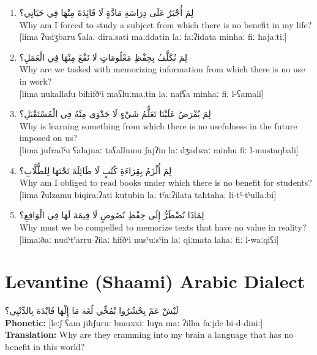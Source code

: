 \documentclass[letterpaper,12pt]{article}
\begin{document}
\begin{enumerate}
\item \textarabic{لِمَ أُجْبَرُ عَلَى دِرَاسَةِ مَادَّةٍ لَا فَائِدَةَ مِنْهَا فِي حَيَاتِي؟}\\
Why am I forced to study a subject from which there is no benefit in my life?\\
{[lima ʔudʒbaru ʕalaː diraːsati maːddatin laː faːʔidata minhaː fiː ħajaːtiː]}

\item \textarabic{لِمَ نُكَلَّفُ بِحِفْظِ مَعْلُومَاتٍ لَا نَفْعَ مِنْهَا فِي الْعَمَلِ؟}\\
Why are we tasked with memorizing information from which there is no use in work?\\
{[lima nukallafu biħifðˤi maʕluːmaːtin laː nafʕa minhaː fiː l-ʕamali]}

\item \textarabic{لِمَ يُفْرَضُ عَلَيْنَا تَعَلُّمُ شَيْءٍ لَا جَدْوَى مِنْهُ فِي الْمُسْتَقْبَلِ؟}\\
Why is learning something from which there is no usefulness in the future imposed on us?\\
{[lima jufradˤu ʕalajnaː taʕallumu ʃajʔin laː dʒadwaː minhu fiː l-mustaqbali]}

\item \textarabic{لِمَ أُلْزَمُ بِقِرَاءَةِ كُتُبٍ لَا طَائِلَةَ تَحْتَهَا لِلطُّلَّابِ؟}\\
Why am I obliged to read books under which there is no benefit for students?\\
{[lima ʔulzamu biqiraːʔati kutubin laː tˤaːʔilata taħtahaː li-tˤ-tˤullaːbi]}

\item \textarabic{لِمَاذَا نُضْطَرُّ إِلَى حِفْظِ نُصُوصٍ لَا قِيمَةَ لَهَا فِي الْوَاقِعِ؟}\\
Why must we be compelled to memorize texts that have no value in reality?\\
{[limaːðaː nudˤtˤarru ʔilaː ħifðˤi nusˤuːsˤin laː qiːmata lahaː fiː l-waːqiʕi]}
\end{enumerate}

\section{Levantine (Shaami) Arabic Dialect}

\begin{tcolorbox}[colback=white,colframe=dialectcolor,title=\textbf{Levantine Version},breakable]
\textarabic{لَيْشْ عَمْ يِحْشُرُوا بْمُخِّي لُغَة مَا إِلْهَا فَايْدَة بِالدِّنْيِي؟}\\[0.3em]
\textbf{Phonetic:} [leːʃ ʕam jiħʃuruː bmuxxiː luɣa maː ʔilha faːjde bi-d-diniː]\\[0.3em]
\textbf{Translation:} Why are they cramming into my brain a language that has no benefit in this world?
\end{tcolorbox}
\end{document}
